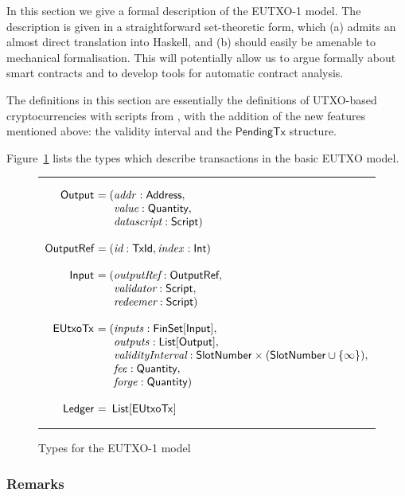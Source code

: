 \documentclass[a4paper]{article}
\renewcommand{\i}{\textit}  %
\newcommand{\s}{\textsf}  %
\theoremstyle{definition}  %
\newenvironment{arraydefs}[1]{\setlength{\arraycolsep}{0pt}\begin{array}{#1}}{\end{array}}
\newcommand\rfskip{7pt}
\newenvironment{ruledfigure}[1]{\begin{figure}[#1]\hrule\vspace{\rfskip}}{\vspace{\rfskip}\hrule\end{figure}}
\newcommand{\List}[1]{\ensuremath{\s{List}[#1]}}
\newcommand{\FinSet}[1]{\ensuremath{\s{FinSet}[#1]}}
\newcommand{\ptx}{\ensuremath{\s{PendingTx}}}
\newcommand{\mi}[1]{\ensuremath{\mathit{#1}}}
\newcommand{\idx}{\mi{index}}
\newcommand{\inputs}{\mi{inputs}}
\newcommand{\outputs}{\mi{outputs}}
\newcommand{\forge}{\mi{forge}}
\newcommand{\fee}{\mi{fee}}
\newcommand{\addr}{\mi{addr}}
\newcommand{\msf}[1]{\ensuremath{\mathsf{#1}}}
\newcommand{\slotnum}{\msf{SlotNumber}}
\newcommand{\eutxotx}{\msf{EUtxoTx}}
\newcommand{\qty}{\ensuremath{\s{Quantity}}}
\begin{document}
In this section we give a formal description of the EUTXO-1 model.  The
description is given in a straightforward set-theoretic form, which
(a) admits an almost direct translation into Haskell, and (b) should
easily be amenable to mechanical formalisation.  This will potentially
allow us to argue formally about smart contracts and to develop tools
for automatic contract analysis.

The definitions in this section are essentially the definitions of
UTXO-based cryptocurrencies with scripts from
\citep{Zahnentferner18-UTxO}, with the addition of the new features
mentioned above: the validity interval and the $\ptx$ structure.

Figure~\ref{fig:eutxo-1-types} lists the types which
describe transactions in the basic EUTXO model.


\begin{ruledfigure}{H}
  \[
  \begin{arraydefs}{rll}
    
    \s{Output } &= (&\addr: \s{Address},\\
    && \i{value}: \qty,\\
    &&  \i{datascript}: \s{Script})\\
    \\
    \s{OutputRef } &= (&\i{id}: \s{TxId}, \idx: \s{Int})\\
    \\
    \s{Input } & = (&\i{outputRef}: \s{OutputRef},\\
                 && \i{validator}: \s{Script},\\
                 && \i{redeemer}: \s{Script})\\
     \\
     \eutxotx\s{ } &= (&\inputs: \FinSet{\s{Input}},\\
     &&\outputs: \List{\s{Output}},\\
     &&\i{validityInterval}: \slotnum \times (\slotnum \cup \{\infty\}),\\
     && \fee: \qty,\\
     &&\forge: \qty) \\
     \\
     \s{Ledger } &=&\!\List{\eutxotx}\\
  \end{arraydefs}
  \]
  \caption{Types for the EUTXO-1 model}
  \label{fig:eutxo-1-types}
\end{ruledfigure}

\subsubsection{Remarks}
\end{document}
